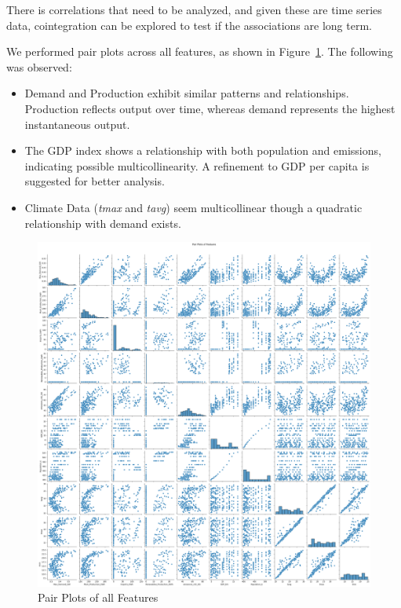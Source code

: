 \documentclass{ieeeaccess}
\begin{document}
There is correlations that need to be analyzed, and given these are time series data, cointegration can be explored to test if the associations are long term.

We performed pair plots across all features, as shown in Figure~\ref{fig:pair_plots}. The following was observed:
\begin{itemize}
    \item Demand and Production exhibit similar patterns and relationships. Production reflects output over time, whereas demand represents the highest instantaneous output.
    \item The GDP index shows a relationship with both population and emissions, indicating possible multicollinearity. A refinement to GDP per capita is suggested for better analysis.
    \item Climate Data (\textit{tmax} and \textit{tavg}) seem multicollinear though a quadratic relationship with demand exists.
\end{itemize}

\begin{figure}[htb]
    \centering
    \includegraphics[width=\columnwidth]{data_analysis/pair_plots.png}
    \caption{Pair Plots of all Features}
    \label{fig:pair_plots}
\end{figure}
\end{document}
